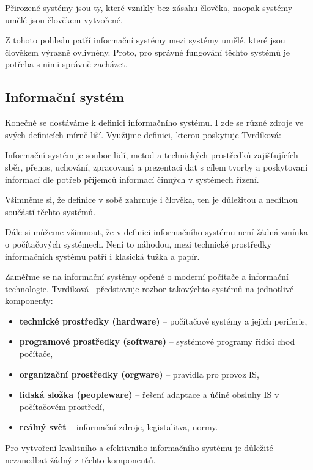 Přirozené systémy jsou ty, které vznikly bez zásahu člověka, naopak systémy umělé jsou člověkem vytvořené. \cite{Tvrdikova2008}

Z tohoto pohledu patří informační systémy mezi systémy umělé, které jsou člověkem výrazně ovlivněny. Proto, pro správné fungování těchto systémů je potřeba s nimi správně zacházet.
\subsection{Informační systém}
Konečně se dostáváme k definici informačního systému. I zde se různé zdroje ve svých definicích mírně liší. \cite{Tvrdikova2008}\cite{Pour2015}\cite{Vymetal2009} Využijme definici, kterou poskytuje Tvrdíková:
\begin{definition}
Informační systém je soubor lidí, metod a technických prostředků zajišťujících sběr, přenos, uchování, zpracovaná a prezentaci dat s cílem tvorby a poskytovaní informací dle potřeb příjemců informací činných v systémech řízení. \cite{Tvrdikova2008}
\end{definition}

Všimněme si, že definice v sobě zahrnuje i člověka, ten je důležitou a nedílnou součástí těchto systémů. 

Dále si můžeme všimnout, že v definici informačního systému není žádná zmínka o počítačových systémech. Není to náhodou, mezi technické prostředky informačních systémů patří i klasická tužka a papír.

Zaměřme se na informační systémy opřené o moderní počítače a informační technologie. \mbox{Tvrdíková}~\cite{Tvrdikova2008} představuje rozbor takovýchto systémů na jednotlivé komponenty:

\begin{itemize}
    \item \textbf{technické prostředky (hardware)} -- počítačové systémy a jejich periferie,
    \item \textbf{programové prostředky (software)} -- systémové programy řidící chod počítače,
    \item \textbf{organizační prostředky (orgware)} -- pravidla pro provoz IS,
    \item \textbf{lidská složka (peopleware)} -- řešení adaptace a účiné obsluhy IS v počítačovém prostředí,
    \item \textbf{reálný svět} -- informační zdroje, legistalitva, normy.
\end{itemize}

Pro vytvoření kvalitního a efektivního informačního systému je důležité nezanedbat žádný z těchto komponentů.
